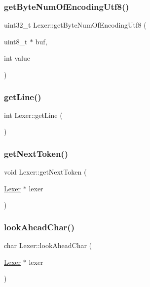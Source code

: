 \subsubsection{\texorpdfstring{getByteNumOfEncodingUtf8()}{getByteNumOfEncodingUtf8()}}
{\footnotesize\ttfamily uint32\+\_\+t Lexer\+::get\+Byte\+Num\+Of\+Encoding\+Utf8 (\begin{DoxyParamCaption}\item[{uint8\+\_\+t $\ast$}]{buf,  }\item[{int}]{value }\end{DoxyParamCaption})}

\mbox{\label{class_lexer_a0ede40225695d9eb9b42d275584cf8f0}} 
\subsubsection{\texorpdfstring{getLine()}{getLine()}}
{\footnotesize\ttfamily int Lexer\+::get\+Line (\begin{DoxyParamCaption}{ }\end{DoxyParamCaption})\hspace{0.3cm}{\ttfamily [inline]}}

\mbox{\label{class_lexer_afa25aeaf08e405e628712a43809fc1e4}} 
\subsubsection{\texorpdfstring{getNextToken()}{getNextToken()}}
{\footnotesize\ttfamily void Lexer\+::get\+Next\+Token (\begin{DoxyParamCaption}\item[{\mbox{\hyperlink{class_lexer}{Lexer}} $\ast$}]{lexer }\end{DoxyParamCaption})}

\mbox{\label{class_lexer_ac67d9874accafc361be7ba6fd03a8381}} 
\subsubsection{\texorpdfstring{lookAheadChar()}{lookAheadChar()}}
{\footnotesize\ttfamily char Lexer\+::look\+Ahead\+Char (\begin{DoxyParamCaption}\item[{\mbox{\hyperlink{class_lexer}{Lexer}} $\ast$}]{lexer }\end{DoxyParamCaption})}

